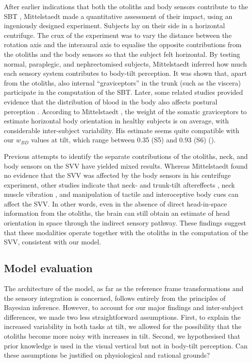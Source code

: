 After earlier indications that both the otoliths and body sensors contribute to the SBT \cite{clark1963, clark1964, nelson1968}, Mittelstaedt \citeyear{mittelstaedt1997} made a quantitative assessment of their impact, using an ingeniously designed experiment. Subjects lay on their side in a horizontal centrifuge. The crux of the experiment was to vary the distance between the rotation axis and the interaural axis to equalise the opposite contributions from the otoliths and the body sensors so that the subject felt horizontal. By testing normal, paraplegic, and nephrectomised subjects, Mittelstaedt inferred how much each sensory system contributes to body-tilt perception. It was shown that, apart from the otoliths, also internal ``graviceptors'' in the trunk (such as the viscera) participate in the computation of the SBT. Later, some related studies provided evidence that the distribution of blood in the body also affects postural perception \cite{vaitl1997, vaitl2002}. According to Mittelstaedt \citeyear{mittelstaedt1998}, the weight of the somatic graviceptors to estimate horizontal body orientation in healthy subjects is  on average, with considerable inter-subject variability. His estimate seems quite compatible with our $w_{BD}$ values at  tilt, which range between 0.35 (S5) and 0.93 (S6) ().

Previous attempts to identify the separate contributions of the otoliths, neck, and body sensors on the SVV have yielded mixed results. Whereas Mittelstaedt \citeyear{mittelstaedt1998} found no evidence that the SVV was affected by the body sensors in his centrifuge experiment, other studies indicate that neck- and trunk-tilt aftereffects \cite{wade1968}, neck muscle vibration \cite{mckenna2004}, and manipulation of tactile and interoceptive body cues \cite{trousselard2004} can affect the SVV. In other words, even in the absence of direct head-in-space information from the otoliths, the brain can still obtain an estimate of head orientation in space through the indirect sensory pathway. These findings suggest that these modalities operate together with the otoliths in the computation of the SVV, consistent with our model.


\subsection{Model evaluation}

The architecture of the model, as far as the reference frame transformations and the sensory integration is concerned, follows entirely from the principles of Bayesian inference. However, to account for our major findings and inter-subject differences, we made two less straightforward assumptions. First, to explain the increased variability in both tasks at  tilt, we allowed for the possibility that the otoliths become more noisy with increases in tilt. Second, we hypothesised that prior knowledge is used in the visual vertical but not in body-tilt perception. Can these assumptions be justified on physiological and rational grounds?

